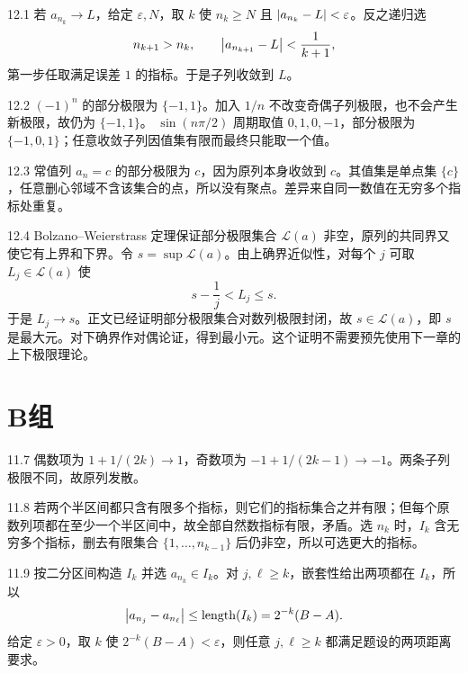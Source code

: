 \begin{solution}{12.1}
若 \(a_{n_k}\to L\)，给定 \(\varepsilon,N\)，取 \(k\) 使
\(n_k\ge N\) 且 \(\left|a_{n_k}-L\right|<\varepsilon\)。反之递归选
\[
 n_{k+1}>n_k,\qquad \left|a_{n_{k+1}}-L\right|<\frac1{k+1},
\]
第一步任取满足误差 \(1\) 的指标。于是子列收敛到 \(L\)。
\end{solution}

\begin{solution}{12.2}
\((-1)^n\) 的部分极限为 \(\{-1,1\}\)。加入 \(1/n\) 不改变奇偶子列极限，也不会产生新极限，故仍为 \(\{-1,1\}\)。
\(\sin(n\pi/2)\) 周期取值 \(0,1,0,-1\)，部分极限为 \(\{-1,0,1\}\)；任意收敛子列因值集有限而最终只能取一个值。
\end{solution}

\begin{solution}{12.3}
常值列 \(a_n=c\) 的部分极限为 \(c\)，因为原列本身收敛到 \(c\)。其值集是单点集 \(\{c\}\)，任意删心邻域不含该集合的点，所以没有聚点。差异来自同一数值在无穷多个指标处重复。
\end{solution}

\begin{solution}{12.4}
Bolzano--Weierstrass 定理保证部分极限集合
\(\mathcal L(a)\) 非空，原列的共同界又使它有上界和下界。令
\(s=\sup\mathcal L(a)\)。由上确界近似性，对每个 \(j\) 可取
\(L_j\in\mathcal L(a)\) 使
\[
 s-\frac1j<L_j\le s.
\]
于是 \(L_j\to s\)。正文已经证明部分极限集合对数列极限封闭，故
\(s\in\mathcal L(a)\)，即 \(s\) 是最大元。对下确界作对偶论证，得到最小元。这个证明不需要预先使用下一章的上下极限理论。
\end{solution}

\section*{B组}

\begin{solution}{11.7}
偶数项为 \(1+1/(2k)\to1\)，奇数项为
\(-1+1/(2k-1)\to-1\)。两条子列极限不同，故原列发散。
\end{solution}

\begin{solution}{11.8}
若两个半区间都只含有限多个指标，则它们的指标集合之并有限；但每个原数列项都在至少一个半区间中，故全部自然数指标有限，矛盾。选 \(n_k\) 时，\(I_k\) 含无穷多个指标，删去有限集合 \(\{1,\ldots,n_{k-1}\}\) 后仍非空，所以可选更大的指标。
\end{solution}

\begin{solution}{11.9}
按二分区间构造 \(I_k\) 并选 \(a_{n_k}\in I_k\)。对 \(j,\ell\ge k\)，嵌套性给出两项都在 \(I_k\)，所以
\[
 \left|a_{n_j}-a_{n_\ell}\right|
 \le\operatorname{length}(I_k)=2^{-k}(B-A).
\]
给定 \(\varepsilon>0\)，取 \(k\) 使
\(2^{-k}(B-A)<\varepsilon\)，则任意 \(j,\ell\ge k\) 都满足题设的两项距离要求。
\end{solution}

